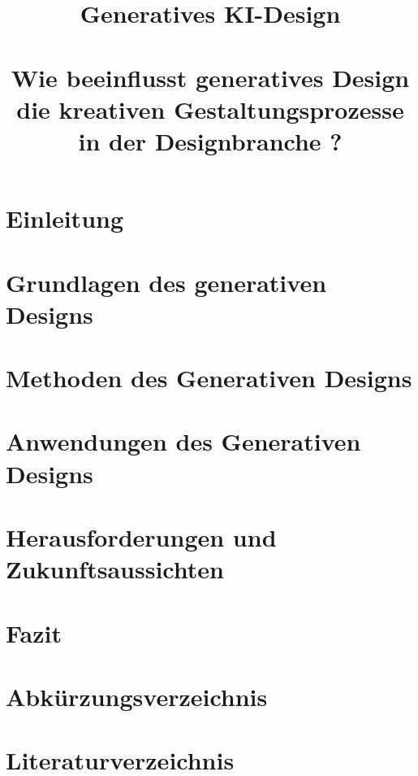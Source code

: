 \documentclass[conference]{IEEEtran}
\begin{document}

\title{Generatives KI-Design\\
\large \ \\ \large Wie beeinflusst generatives Design die kreativen Gestaltungsprozesse in der Designbranche ?}

\author{

  \and

}

\maketitle



\section{Einleitung}


\section{Grundlagen des generativen Designs}


\section{Methoden des Generativen Designs}


\section{Anwendungen des Generativen Designs}


\section{Herausforderungen und Zukunftsaussichten}


\section{Fazit}



\listoffigures
{}

\section*{Abkürzungsverzeichnis}


\section*{Literaturverzeichnis}
\printbibliography[heading=none]{}
\end{document}
